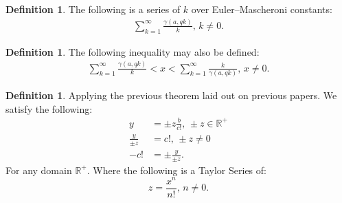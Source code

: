\documentclass[10pt]{article}
\theoremstyle{plain}
\theoremstyle{definition}
\newtheorem{definition}[theorem]{Definition}
\theoremstyle{remark}
\begin{document}
\begin{definition}
	\label{theo:2.19}
	The following is a series of $k$ over Euler–Mascheroni constants:
	\begin{align*}
		\sum_{k=1}^{\infty} \frac{\gamma(a, qk)}{k}, \, k \neq 0.
	\end{align*}
\end{definition}

\begin{definition}
	The following inequality may also be defined:
	\begin{align*}
		\sum_{k=1}^{\infty} \frac{\gamma(a, qk)}{k} < x < \sum_{k=1}^{\infty} \frac{k}{\gamma(a, qk)}, \, x \neq 0.
	\end{align*}
\end{definition}

\begin{definition}
	Applying the previous theorem laid out on previous papers. We satisfy the following:
	\begin{align*}
		y &= \pm z \frac{b}{c!}, \, \pm z \in \mathbb{R}^{+}\\
		\frac{y}{\pm z} &= c!, \, \pm z \neq 0\\
		-c! &= \pm \frac{y}{\pm z}.
	\end{align*}
	For any domain $\mathbb{R}^{+}$. Where the following is a Taylor Series of:
	\begin{equation}
		z = \frac{x^n}{n!}, \, n \neq 0.
	\end{equation}
\end{definition}
\end{document}

